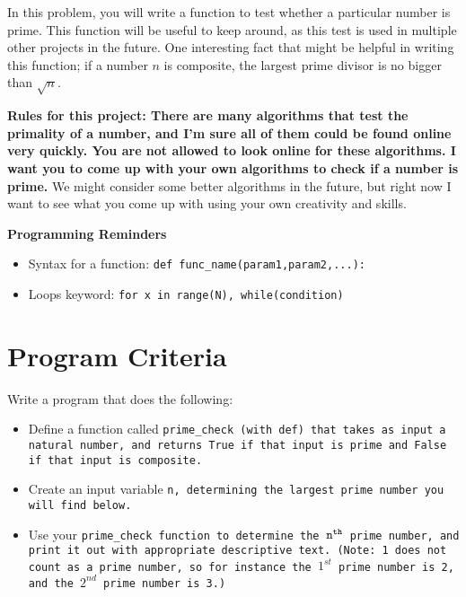 \documentclass{article}
\def\prog#1{
\vspace{.1in}\begin{mdframed} \begin{center} \textbf{Programming Reminders} \end{center}#1 \end{mdframed} }
\begin{document}
	In this problem, you will write a function to test whether a particular number is prime.  This function will be useful to keep around, as this test is used in multiple other projects in the future.  One interesting fact that might be helpful in writing this function; if a number $n$ is composite, the largest prime divisor is no bigger than $\sqrt{n}$.
	
	\textbf{Rules for this project: There are many algorithms that test the primality of a number, and I'm sure all of them could be found online very quickly.  You are not allowed to look online for these algorithms.  I want you to come up with your own algorithms to check if a number is prime.}  We might consider some better algorithms in the future, but right now I want to see what you come up with using your own creativity and skills.
	
	
	
	
	
	
	
	
	
	\prog{
		\begin{itemize}
			\item Syntax for a function: \tt{def func\_name(param1,param2,...):}
			\item Loops keyword: \tt{for x in range(N)}, \tt{while(condition)}
		\end{itemize}
		}




\section*{Program Criteria}
	Write a program that does the following:
	\begin{itemize}
		\item Define a function called \tt{prime\_check} (with \tt{def}) that takes as input a natural number, and returns \tt{True} if that input is prime and \tt{False} if that input is composite.
		\item Create an input variable \tt{n}, determining the largest prime number you will find below.
		\item Use your \tt{prime\_check} function to determine the $\tt{n}^{th}$ prime number, and print it out with appropriate descriptive text.  (Note: 1 does not count as a prime number, so for instance the $1^{st}$ prime number is 2, and the $2^{nd}$ prime number is 3.)
	\end{itemize}
\end{document}
